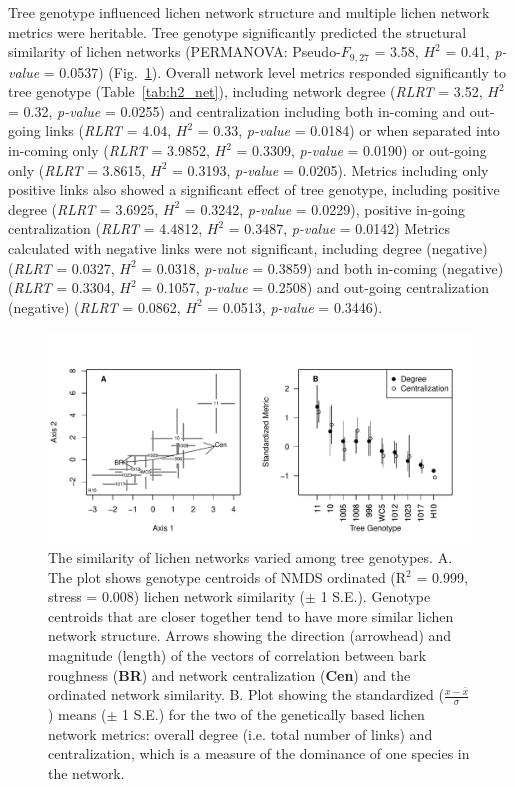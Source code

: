 \documentclass[fleqn,12pt]{olplainarticle}
\begin{document}
Tree genotype influenced lichen network structure and multiple lichen
network metrics were heritable.  Tree genotype significantly predicted
the structural similarity of lichen networks (PERMANOVA:
Pseudo-$F_{9,27}$ = 3.58, $H^2$ = 0.41, \textit{p-value} = 0.0537)
(Fig.~\ref{fig:h2_plot}).  Overall network level metrics responded
significantly to tree genotype (Table~\ref{tab:h2_net}), including
network degree (\textit{RLRT} = 3.52, $H^2$ = 0.32, \textit{p-value} =
0.0255) and centralization including both in-coming and out-going
links (\textit{RLRT} = 4.04, $H^2$ = 0.33, \textit{p-value} = 0.0184)
or when separated into in-coming only (\textit{RLRT} = 3.9852, $H^2$ =
0.3309, \textit{p-value} = 0.0190) or out-going only (\textit{RLRT} =
3.8615, $H^2$ = 0.3193, \textit{p-value} = 0.0205).  Metrics including
only positive links also showed a significant effect of tree genotype,
including positive degree (\textit{RLRT} = 3.6925, $H^2$ = 0.3242,
\textit{p-value} = 0.0229), positive in-going centralization
(\textit{RLRT} = 4.4812, $H^2$ = 0.3487, \textit{p-value} = 0.0142)
Metrics calculated with negative links were not significant, including
degree (negative) (\textit{RLRT} = 0.0327, $H^2$ = 0.0318,
\textit{p-value} = 0.3859) and both in-coming (negative)
(\textit{RLRT} = 0.3304, $H^2$ = 0.1057, \textit{p-value} = 0.2508)
and out-going centralization (negative) (\textit{RLRT} = 0.0862, $H^2$
= 0.0513, \textit{p-value} = 0.3446).

\begin{figure}[ht]
\centering
\includegraphics[width=\linewidth]{h2_plot.pdf}
\caption{The similarity of lichen networks varied among tree
  genotypes. A. The plot shows genotype centroids of NMDS ordinated
  (R$^2$ = 0.999, stress = 0.008) lichen network similarity ($\pm$ 1
  S.E.). Genotype centroids that are closer together tend to have more
  similar lichen network structure. Arrows showing the direction
  (arrowhead) and magnitude (length) of the vectors of correlation
  between bark roughness (\textbf{BR}) and network centralization
  (\textbf{Cen}) and the ordinated network similarity. B. Plot showing
  the standardized ($\frac{x - \bar{x}}{\sigma}$) means ($\pm$ 1 S.E.)
  for the two of the genetically based lichen network metrics: overall
  degree (i.e. total number of links) and centralization, which is a
  measure of the dominance of one species in the network.}
\label{fig:h2_plot}
\end{figure}
\end{document}
